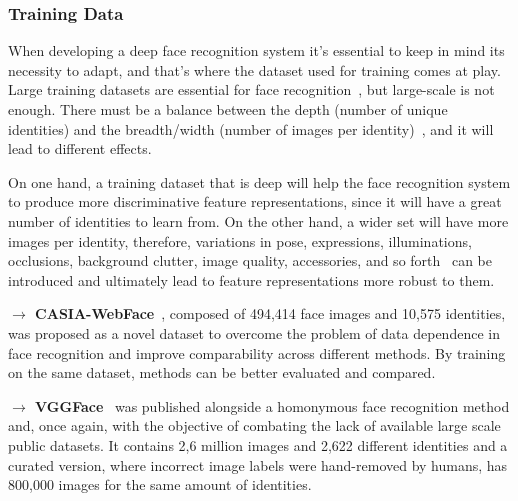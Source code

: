 \documentclass[class=report, crop=false, a4paper, 12pt]{standalone}
\begin{document}
\subsubsection{\large Training Data}
\par When developing a deep face recognition system it's essential to keep in mind its necessity to adapt, and that's where the dataset used for training comes at play. Large training datasets are essential for face recognition~\autocite{parkhiDeepFaceRecognition2015}, but large-scale is not enough. There must be a balance between the depth (number of unique identities) and the breadth/width (number of images per identity)~\autocite{bansalDonTsCNNbased2017, caoVGGFace2DatasetRecognising2018}, and it will lead to different effects. 
\par On one hand, a training dataset that is deep will help the face recognition system to produce more discriminative feature representations, since it will have a great number of identities to learn from. On the other hand, a wider set will have more images per identity, therefore, variations in pose, expressions, illuminations, occlusions, background clutter, image quality, accessories, and so forth~\autocite{baeDigiFace1MMillionDigital2023} can be introduced and ultimately lead to feature representations more robust to them.


\vspace{0.7\baselineskip}
\noindent\textbf{$\rightarrow$ CASIA-WebFace}~\autocite{yiLearningFaceRepresentation2014}, composed of 494,414 face images and 10,575 identities, was proposed as a novel dataset to overcome the problem of data dependence in face recognition and improve comparability across different methods. By training on the same dataset, methods can be better evaluated and compared.

\vspace{0.7\baselineskip}
\noindent\textbf{$\rightarrow$ VGGFace}~\autocite{parkhiDeepFaceRecognition2015} was published alongside a homonymous face recognition method and, once again, with the objective of combating the lack of available large scale public datasets. It contains 2,6 million images and 2,622 different identities and a curated version, where incorrect image labels were hand-removed by humans, has 800,000 images for the same amount of identities.
\end{document}
